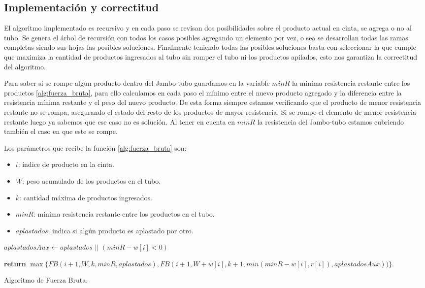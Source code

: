 \documentclass[10pt,a4paper]{article}
\begin{document}
\subsection{Implementación y correctitud}
El algoritmo implementado es recursivo y en cada paso se revisan dos posibilidades sobre el producto actual en cinta, se agrega o no al tubo. Se genera el árbol de recursión con todos los casos posibles agregando un elemento por vez, o sea se desarrollan todas las ramas completas siendo sus hojas las posibles soluciones. Finalmente teniendo todas las posibles soluciones basta con seleccionar la que cumple que maximiza la cantidad de productos ingresados al tubo sin romper el tubo ni los productos apilados, esto nos garantiza la correctitud del algoritmo.

Para saber si se rompe algún producto dentro del Jambo-tubo guardamos en la variable $minR$ la mínima resistencia restante entre los productos \ref{alg:fuerza_bruta}, para ello calculamos en cada paso el mínimo entre el nuevo producto agregado y la diferencia entre la resistencia mínima restante y el peso del nuevo producto. De esta forma siempre estamos verificando que el producto de menor resistencia restante no se rompa, asegurando el estado del resto de los productos de mayor resistencia. Si se rompe el elemento de menor resistencia restante luego ya sabemos que ese caso no es solución. Al tener en cuenta en $minR$ la resistencia del Jambo-tubo estamos cubriendo también el caso en que este se rompe.

Los parámetros que recibe la función \ref{alg:fuerza_bruta} son:
\begin{itemize}
	\item $i$: índice de producto en la cinta.
	\item $W$: peso acumulado de los productos en el tubo.
	\item $k$: cantidad máxima de productos ingresados.
	\item $minR$: mínima resistencia restante entre los productos en el tubo.
	\item $aplastados$: indica si algún producto es aplastado por otro.
\end{itemize}

\begin{algorithm}
	\begin{algorithmic}[1]

		\EndIf
		
		\State $aplastadosAux \leftarrow aplastados$ $||$ $(minR - w[i] < 0)$ 
		
		\State \textbf{return} $\max \{ FB(i+1, W, k, minR, aplastados), FB(i+1, W+w[i], k+1, min(minR - w[i], r[i]), aplastadosAux)) \}$.

		\EndFunction
	\end{algorithmic}
	\caption{Algoritmo de Fuerza Bruta.}
	\label{alg:fuerza_bruta}
\end{algorithm} 	
\end{document}
